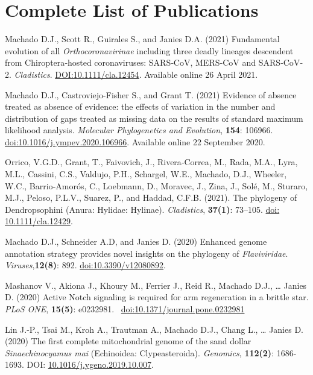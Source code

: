 
\section{Complete List of Publications}

	{
		\setlength{\parskip}{.5em}\renewcommand{\baselinestretch}{2.0}
		\begin{hangparas}{.25in}{1}
		
		Machado D.J., Scott R., Guirales S., and Janies D.A. (2021) Fundamental evolution of all \emph{Orthocoronavirinae} including three deadly lineages descendent from Chiroptera‐hosted coronaviruses: SARS‐CoV, MERS‐CoV and SARS‐CoV‐2. \emph{Cladistics}. \href{https://doi.org/10.1111/cla.12454}{DOI:10.1111/cla.12454}. Available online 26 April 2021.
    
        Machado D.J., Castroviejo-Fisher S., and Grant T. (2021) Evidence of absence treated as absence of evidence: the effects of variation in the number and distribution of gaps treated as missing data on the results of standard maximum likelihood analysis. \emph{Molecular Phylogenetics and Evolution}, \textbf{154}: 106966. \href{https://doi.org/10.1016/j.ympev.2020.106966}{doi:10.1016/j.ympev.2020.106966}. Available online 22 September 2020.
        
        Orrico, V.G.D., Grant, T., Faivovich, J., Rivera‐Correa, M., Rada, M.A., Lyra, M.L., Cassini, C.S., Valdujo, P.H., Schargel, W.E., Machado, D.J., Wheeler, W.C., Barrio‐Amorós, C., Loebmann, D., Moravec, J., Zina, J., Solé, M., Sturaro, M.J., Peloso, P.L.V., Suarez, P., and Haddad, C.F.B. (2021). The phylogeny of Dendropsophini (Anura: Hylidae: Hylinae). \emph{Cladistics}, \textbf{37(1)}: 73–105. \href{https://doi.org/10.1111/cla.12429}{doi: 10.1111/cla.12429}.
    
        Machado D.J., Schneider A.D, and Janies D. (2020) Enhanced genome annotation strategy provides novel insights on the phylogeny of \emph{Flaviviridae}. \emph{Viruses},\textbf{12(8)}: 892. \href{https://www.mdpi.com/1999-4915/12/8/892}{doi:10.3390/v12080892}.
	
	    Mashanov V., Akiona J., Khoury M., Ferrier J., Reid R., Machado D.J., … Janies D. (2020) Active Notch signaling is required for arm regeneration in a brittle star. \emph{PLoS ONE}, \textbf{15(5)}: e0232981. ~\href{https://doi.org/10.1371/journal.pone.0232981}{doi:10.1371/journal.pone.0232981}
	    
	    Lin J.-P., Tsai M., Kroh A., Trautman A., Machado D.J., Chang L., … Janies D. (2020) The first complete mitochondrial genome of the sand dollar \emph{Sinaechinocyamus mai} (Echinoidea: Clypeasteroida). \emph{Genomics}, \textbf{112(2)}: 1686-1693. DOI: \href{https://doi.org/10.1016/j.ygeno.2019.10.007}{10.1016/j.ygeno.2019.10.007}.
	

\end{hangparas}}

